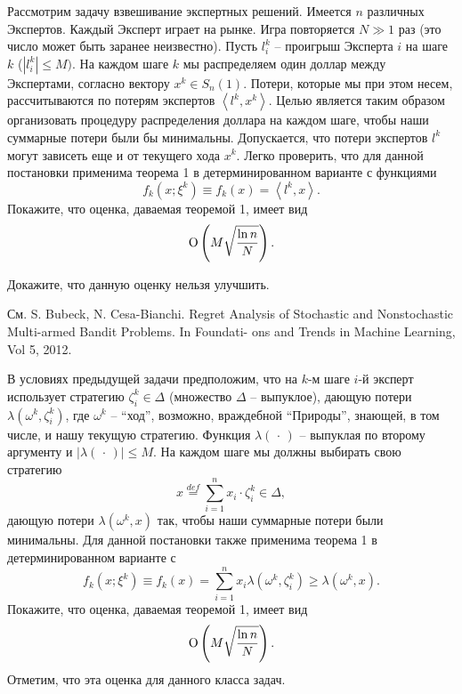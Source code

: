 \begin{problem}
Рассмотрим задачу взвешивание экспертных решений. Имеется $n$ различных 
Экспертов. Каждый Эксперт играет на рынке. Игра повторяется $N\gg 1$ раз 
(это число может быть заранее неизвестно). Пусть $l_i^k $ -- проигрыш 
Эксперта $i$ на шаге $k$ ($\left| {l_i^k } \right|\le M)$. На каждом шаге 
$k$ мы распределяем один доллар между Экспертами, согласно вектору $x^k\in 
S_n \left( 1 \right)$. Потери, которые мы при этом несем, рассчитываются по 
потерям экспертов $\left\langle {l^k,x^k} \right\rangle $. Целью является 
таким образом организовать процедуру распределения доллара на каждом шаге, 
чтобы наши суммарные потери были бы минимальны. Допускается, что потери 
экспертов $l^k$ могут зависеть еще и от текущего хода $x^k$. Легко 
проверить, что для данной постановки применима теорема 1 в детерминированном 
варианте с функциями
\[
f_k \left( {x;\xi ^k} \right)\equiv f_k \left( x \right)=\left\langle 
{l^k,x} \right\rangle .
\]
Покажите, что оценка, даваемая теоремой 1, имеет вид
\[
{\rm O}\left( {M\sqrt {\frac{\ln n}{N}} } \right).
\]

Докажите, что данную оценку нельзя улучшить. 
\end{problem}

\begin{ordre} См. S. Bubeck, N. Cesa-Bianchi. Regret Analysis of Stochastic and Nonstochastic Multi-armed Bandit Problems. In Foundati- ons and Trends in Machine Learning, Vol 5, 2012. 
\end{ordre}

\begin{problem}
В условиях предыдущей задачи предположим, что на $k$-м шаге $i$-й эксперт 
использует стратегию $\zeta _i^k \in \Delta $ (множество $\Delta $ -- 
выпуклое), дающую потери $\lambda \left( {\omega ^k,\zeta _i^k } \right)$, 
где $\omega ^k$ -- ``ход'', возможно, враждебной ``Природы'', знающей, в том 
числе, и нашу текущую стратегию. Функция $\lambda \left( {\,\cdot \,} 
\right)$ -- выпуклая по второму аргументу и $\left| {\lambda \left( {\,\cdot 
\,} \right)} \right|\le M$. На каждом шаге мы должны выбирать свою стратегию
\[
x\mathop =\limits^{def} \sum\limits_{i=1}^n {x_i \cdot \zeta _i^k } \in 
\Delta ,
\]
дающую потери $\lambda \left( {\omega ^k,x} \right)$ так, чтобы наши 
суммарные потери были минимальны. Для данной постановки также применима 
теорема 1 в детерминированном варианте с
\[
f_k \left( {x;\xi ^k} \right)\equiv f_k \left( x \right)=\sum\limits_{i=1}^n 
{x_i \lambda \left( {\omega ^k,\zeta _i^k } \right)} \ge \lambda \left( 
{\omega ^k,x} \right).
\]
Покажите, что оценка, даваемая теоремой 1, имеет вид
\[
{\rm O}\left( {M\sqrt {\frac{\ln n}{N}} } \right).
\]
Отметим, что эта оценка для данного класса задач.

\end{problem}

